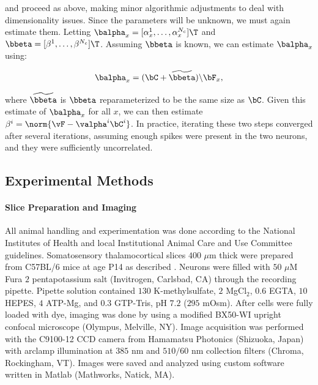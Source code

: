 \noindent and proceed as above, making minor algorithmic adjustments to deal with dimensionality issues.  Since the parameters will be unknown, we must again estimate them. Letting $\balpha_x=[\alpha_x^1, \ldots, \alpha_x^{N_c}]\T$ and $\bbeta=[\beta^1, \ldots, \beta^{N_c}]\T$.  Assuming $\bbeta$ is known, we can estimate $\balpha_x$ using:

\begin{align}
\balpha_x = (\bC + \widetilde{\bbeta})\backslash \bF_x,
\end{align}

\noindent where $\widetilde{\bbeta}$ is $\bbeta$ reparameterized to be the same size as $\bC$.  Given this estimate of $\balpha_x$ for all $x$, we can then estimate $\beta^i=\norm{\vF - \valpha^i \bC^i}$.  In practice, iterating these two steps converged after several iterations, assuming enough spikes were present in the two neurons, and they were sufficiently uncorrelated.



















\subsection{Experimental Methods} \label{sec:exp}

\paragraph{Slice Preparation and Imaging}

All animal handling and experimentation was done according to the National Institutes of Health and local Institutional Animal Care and Use Committee guidelines. Somatosensory thalamocortical slices $400$ $\mu$m thick were prepared from C57BL/6 mice at age P14 as described \cite{MacLeanYuste05}. Neurons were filled with $50$ $\mu$M Fura $2$ pentapotassium salt (Invitrogen, Carlsbad, CA) through the recording pipette. Pipette solution contained $130$ K-methylsulfate, $2$ MgCl$_2$, $0.6$ EGTA, $10$ HEPES, $4$ ATP-Mg, and $0.3$ GTP-Tris, pH $7.2$ ($295$ mOsm).  After cells were fully loaded with dye, imaging was done by using a modified BX50-WI upright confocal microscope (Olympus, Melville, NY).  Image acquisition was performed with the C9100-12 CCD camera from Hamamatsu Photonics (Shizuoka, Japan) with arclamp illumination at $385$ nm and $510/60$ nm collection filters (Chroma, Rockingham, VT).  Images were saved and analyzed using custom software written in Matlab (Mathworks, Natick, MA).

